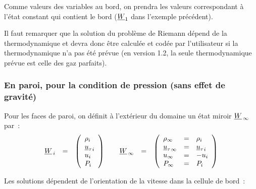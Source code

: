 Comme valeurs des variables au bord, on prendra les valeurs correspondant à
l'état constant qui contient le bord ($\underline{W}_1$ dans l'exemple
précédent).

Il faut remarquer que la solution du problème de Riemann dépend de la
thermodynamique et devra donc être calculée et codée
par l'utilisateur si la thermodynamique n'a pas été prévue
(en version 1.2, la seule
thermodynamique prévue est celle des gaz parfaits).



\subsubsection*{En paroi, pour la condition de pression (sans effet de gravité)}

Pour les faces de paroi, on définit à l'extérieur du domaine
un état miroir $\underline{W}_{\,\infty}$ par~:
\begin{equation}\label{Cfbl_Cfxtcl_eq_paroi_cfxtcl}
\begin{array}{lllll}
\underline{W}_{\,i} &=&
\left(\begin{array}{l}
\rho_i\\ {\underline{u}_\tau}_i\\ u_i\\ P_i
\end{array}\right)
\qquad
\underline{W}_{\,\infty} &=&
\left(\begin{array}{lll}
\rho_\infty &=& \rho_i\\
{\underline{u}_\tau}_\infty &=& {\underline{u}_\tau}_i\\
u_\infty &=& -u_i\\
P_\infty &=& P_i
\end{array}\right)
\end{array}
\end{equation}

\vspace{0.5cm}

Les solutions dépendent de l'orientation de la vitesse dans la cellule
de bord~:

\vspace{0.5cm}

